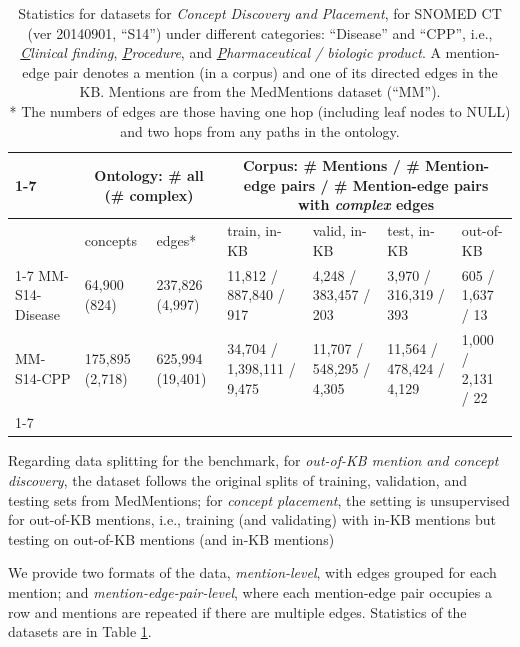 \documentclass[sigconf]{acmart}
\begin{document}
\begin{table}[ht]
\small
\caption{Statistics for datasets for \textit{Concept Discovery and Placement}, for SNOMED CT (ver 20140901, ``S14'') under different categories: ``Disease'' and ``CPP'', i.e., \textit{\underline{C}linical finding}, \textit{\underline{P}rocedure}, and \textit{\underline{P}harmaceutical / biologic product}. A mention-edge pair denotes a mention (in a corpus) and one of its directed edges in the KB. 
Mentions are from the MedMentions dataset (``MM''). \\ 
* The numbers of edges are those having one hop (including leaf nodes to NULL) and two hops from any paths in the ontology.
}\label{data-statistics}
\begin{tabular}{l|l|l|lll|l}
\cline{1-7}

                                            & \multicolumn{2}{c}{Ontology: \# all (\# complex) }                                           & \multicolumn{4}{|c}{Corpus: \# Mentions / \# Mention-edge pairs / \# Mention-edge pairs with \textit{complex} edges}                             \\ \hline                       & concepts & edges* & train, in-KB   & valid, in-KB & test, in-KB & out-of-KB \\
\cline{1-7}
MM-S14-Disease & 64,900 (824)        & 237,826 (4,997)      & 11,812 / 887,840 / 917  & 4,248 / 383,457 / 203    & 3,970 / 316,319 / 393    & 605 / 1,637 / 13 \\             
MM-S14-CPP     & 175,895 (2,718)      & 625,994 (19,401)     & 34,704 / 1,398,111 / 9,475 & 11,707 / 548,295 / 4,305     & 11,564 / 478,424 / 4,129     & 1,000 / 2,131 / 22                  \\
\cline{1-7}
\end{tabular}
\end{table}

Regarding data splitting for the benchmark, for \textit{out-of-KB mention and concept discovery}, the dataset follows the original splits of training, validation, and testing sets from MedMentions; for \textit{concept placement}, the setting is unsupervised for out-of-KB mentions, i.e., training (and validating) with in-KB mentions but testing on out-of-KB mentions (and in-KB mentions)

We provide two formats of the data, \textit{mention-level}, with edges grouped for each mention; and \textit{mention-edge-pair-level}, where each mention-edge pair occupies a row and mentions are repeated if there are multiple edges. Statistics of the datasets are in Table \ref{data-statistics}. 
\end{document}
